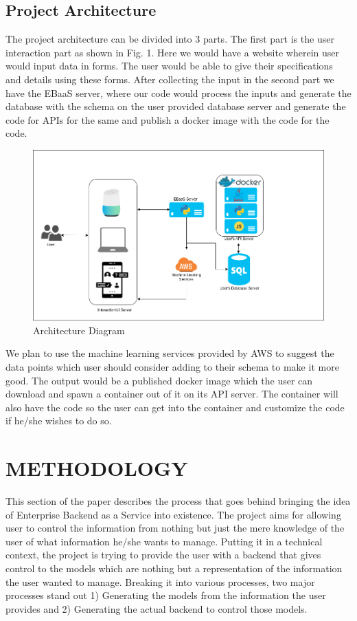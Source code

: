 \documentclass[letterpaper, 10 pt, conference]{ieeeconf}
\begin{document}
\subsection{Project Architecture}
The project architecture can be divided into 3 parts. The first part is the user interaction part as shown in Fig. 1. Here we would have a website wherein user would input data in forms. The user would be able to give their specifications and details using these forms. After collecting the input in the second part we have the EBaaS server, where our code would process the inputs and generate the database with the schema on the user provided database server and generate the code for APIs for the same and publish a docker image with the code for the code. 

\begin{figure}[h]
   \centering
   \includegraphics[scale=0.23]{./ArchDiagram.png}
   \caption{Architecture Diagram}
   \label{fig:my_label}
\end{figure}

We plan to use the machine learning services provided by AWS to suggest the data points which user should consider adding to their schema to make it more good. The output would be a published docker image which the user can download and spawn a container out of it on its API server. The container will also have the code so the user can get into the container and customize the code if he/she wishes to do so.


\section{METHODOLOGY}
This section of the paper describes the process that goes behind bringing the idea of Enterprise Backend as a Service into existence. The project aims for allowing user to control the information from nothing but just the mere knowledge of the user of what information he/she wants to manage. Putting it in a technical context, the project is trying to provide the user with a backend that gives control to the models which are nothing but a representation of the information the user wanted to manage. Breaking it into various processes, two major processes stand out 1) Generating the models from the information the user provides and 2) Generating the actual backend to control those models. 
\end{document}
